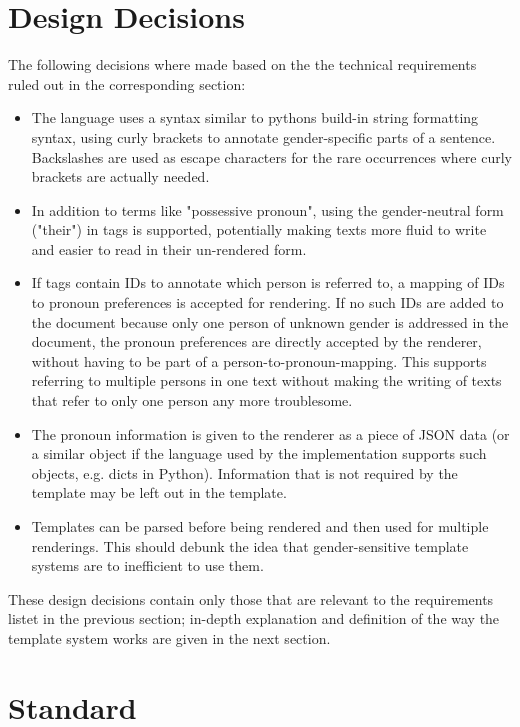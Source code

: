 \documentclass{article}
\begin{document}
\section{Design Decisions}

    The following decisions where made based on the the technical requirements ruled out in the corresponding section:

    \begin{itemize}
        \item The language uses a syntax similar to pythons build-in string formatting syntax, using curly brackets to annotate gender-specific parts of a sentence.
        Backslashes are used as escape characters for the rare occurrences where curly brackets are actually needed.
        \item In addition to terms like "possessive pronoun", using the gender-neutral form ("their") in tags is supported, potentially making texts more fluid to write and easier to read in their un-rendered form.
        \item If tags contain IDs to annotate which person is referred to, a mapping of IDs to pronoun preferences is accepted for rendering.
        If no such IDs are added to the document because only one person of unknown gender is addressed in the document, the pronoun preferences are directly accepted by the renderer, without having to be part of a person-to-pronoun-mapping.
        This supports referring to multiple persons in one text without making the writing of texts that refer to only one person any more troublesome.
        \item The pronoun information is given to the renderer as a piece of JSON data (or a similar object if the language used by the implementation supports such objects, e.g. dicts in Python).
        Information that is not required by the template may be left out in the template.
        \item Templates can be parsed before being rendered and then used for multiple renderings.
        This should debunk the idea that gender-sensitive template systems are to inefficient to use them.
    \end{itemize}

    These design decisions contain only those that are relevant to the requirements listet in the previous section;
    in-depth explanation and definition of the way the template system works are given in the next section.

\section{Standard}
\end{document}
